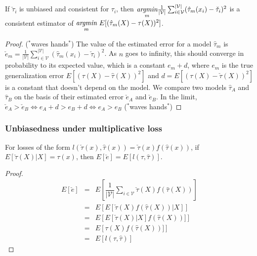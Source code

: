 \begin{theorem}
If $\check\tau_i$ is unbiased and consistent for $\tau_i$, then $\underset{m}{\emph{argmin}}\frac{1}{|\mathcal{V}|}\sum_{i \in \mathcal{V}}^{|\mathcal{V}|}  (\hat \tau_m(x_i) - \check \tau_i)^2$ is a consistent estimator of $\underset{m}{\emph{argmin}} \ E[(\hat\tau_m(X) - \tau(X))^2]$.
\end{theorem}

\begin{proof}

($^*$waves hands$^*$) The value of the estimated error for a model $\hat\tau_m$ is $\check e_m = \frac{1}{|\mathcal{V}|}\sum_{i \in \mathcal{V}}^{|\mathcal{V}|}  (\hat \tau_m(x_i) - \check \tau_i)^2 $. As $n$ goes to infinity, this should converge in probability to its expected value, which is a constant $e_m + d$, where $e_m$ is the true generalization error $E[(\tau(X) - \hat\tau(X))^2]$ and $d=E[(\tau(X) - \check\tau(X))^2]$ is a constant that doesn't depend on the model. We compare two models $\hat\tau_A$ and $\hat\tau_B$ on the basis of their estimated error $\check e_A$ and $\check e_B$. In the limit, $\check e_A > \check e_B \iff  e_A + d >  e_B + d \iff  e_A >  e_B$ ($^*$waves hands$^*$) 

\end{proof}

\subsubsection{Unbiasedness under multiplicative loss}

\begin{theorem}
For losses of the form $l(\check\tau(x), \hat\tau(x)) = \check\tau(x) f(\hat\tau(x))$, if $E[\check\tau(X)|X] = \tau(x)$, then $E[\check e] = E [  l(\tau, \hat\tau) ]$.
\end{theorem}

\begin{proof}

\[
\begin{array}{rcl}
	E[\check e] & = & E \left[ \dfrac{1}{| \mathcal V |} \sum_{i \in \mathcal V} \check\tau(X) f(\hat\tau(X)) \right] \\
	& = & E \left[  E[ \check\tau(X) f(\hat\tau(X)) | X] \right] \\
	& = & E \left[  E[ \check\tau(X)|X] f(\hat\tau(X))] \right] \\
	& = & E \left[  \tau(X) f(\hat\tau(X))] \right] \\
	& = & E [  l(\tau, \hat\tau) ]
\end{array}
\]

\end{proof}

